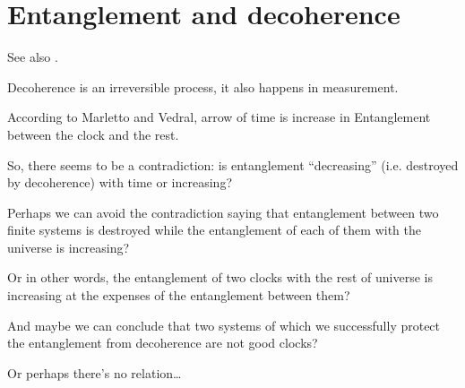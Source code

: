 
\section{Entanglement and decoherence}
See also \cite{EntanglementVsDecoherence}.

Decoherence is an irreversible process, it also happens in measurement.

According to Marletto and Vedral, arrow of time is increase in Entanglement
between the clock and the rest.

So, there seems to be a contradiction: is entanglement ``decreasing''
(i.e. destroyed by decoherence) with time
or increasing?

Perhaps we can avoid the contradiction saying that
entanglement between two finite systems is
destroyed while the entanglement of each of them with the universe
is increasing?

Or in other words, the entanglement of two clocks with the rest of universe
is increasing at the expenses of the entanglement between them?

And maybe we can conclude that two systems  of which we successfully
protect the entanglement from decoherence are not good clocks?

Or perhaps there's no relation\dots
